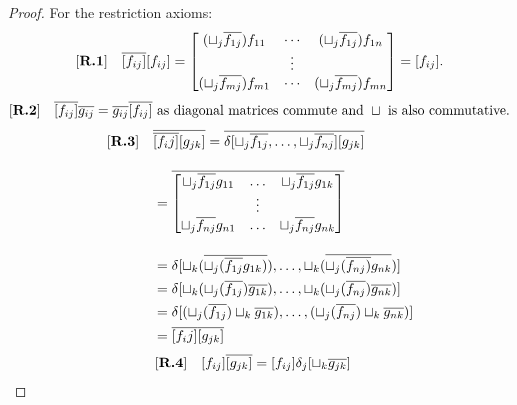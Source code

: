 \begin{proof}
  For the restriction axioms:
  \begin{align*}
    [\text{\bfseries {R}.{1}}] \quad& \overline{[f_{ij}]}[f_{ij}] =
      \begin{bmatrix}
        (\sqcup_j \overline{f_{1j}}) f_{11} & \cdots & (\sqcup_j \overline{f_{1 j}}) f_{1n}\\
        & \vdots & \\
        (\sqcup_j \overline{f_{mj}}) f_{m1} & \cdots & (\sqcup_j \overline{f_{mj}}) f_{m n}
      \end{bmatrix} = [f_{ij}].\\
  \end{align*}
  \begin{align*}
    [\text{\bfseries {R}.{2}}] \quad & \overline{[f_{ij}]} \overline{g_{ij}} =  \overline{g_{ij}} \overline{[f_{ij}]}
      \text{ as diagonal matrices commute and }\sqcup\text{ is also commutative.}\\
  \end{align*}
  \begin{align*}
    [\text{\bfseries {R}.{3}}] \quad & \overline{\overline{[f_ij]}[g_{j k}]} =
      \overline{\delta[\sqcup_j \overline{f_{1j}},\ldots,\sqcup_j \overline{f_{n j}}] [g_{j k}]}
      \\[10pt]
      & = \overline{\begin{bmatrix}
        \sqcup_j \overline{f_{1j}} g_{11} & \ldots & \sqcup_j \overline{f_{1 j}} g_{1 k}\\
        & \vdots & \\
        \sqcup_j \overline{f_{nj}} g_{n 1} & \ldots & \sqcup_j \overline{f_{n j}} g_{n k}\\
      \end{bmatrix}} \\[10pt]
      & = \delta[\sqcup_k (\overline{\sqcup_j (\overline{f_{1j}} g_{1k})}), \ldots,
                 \sqcup_k (\overline{\sqcup_j(\overline{f_{nj})} g_{n k}})]\\
      & = \delta[\sqcup_k (\sqcup_j(\overline{f_{1j}}) \overline{g_{1k}}), \ldots,
                 \sqcup_k (\sqcup_j(\overline{f_{nj}}) \overline{g_{n k}})]\\
      & = \delta[(\sqcup_j(\overline{f_{1j}}) \sqcup_k  \overline{g_{1k}}), \ldots,
                 (\sqcup_j(\overline{f_{nj}}) \sqcup_k  \overline{g_{n k}})]\\
      & = \overline{[f_ij]}\overline{[g_{j k}]}\\
  \end{align*}
  \begin{align*}
      \rfour \quad & [f_{i\jay}]\rst{[g_{\jay k}]} = [f_{i\jay}]\delta_\jay[\sqcup_k \rst{g_{\jay k}}]

\end{align*}
\end{proof}
